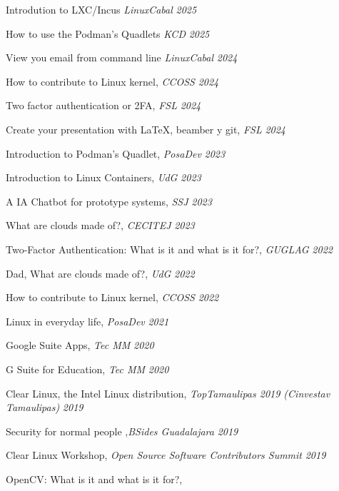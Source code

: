 
\begin{loneinnerlist}

  \item Introdution to LXC/Incus \emph{LinuxCabal} \hfill{\emph{2025}}
  \item How to use the Podman's Quadlets \emph{KCD} \hfill{\emph{2025}}
  \item View you email from command line \emph{LinuxCabal} \hfill{\emph{2024}}
  \item How to contribute to Linux kernel, \emph{CCOSS} \hfill{\emph{2024}}
  \item Two factor authentication or 2FA, \emph{FSL} \hfill{\emph{2024}}
  \item Create your presentation with \LaTeX{}, beamber y git, \emph{FSL} \hfill{\emph{2024}}
  \item Introduction to Podman's Quadlet, \emph{PosaDev} \hfill{\emph{2023}}
  \item Introduction to Linux Containers, \emph{UdG} \hfill{\emph{2023}}
  \item A IA Chatbot for prototype systems, \emph{SSJ} \hfill{\emph{2023}}
  \item What are clouds made of?, \emph{CECITEJ} \hfill{\emph{2023}}
  \item Two-Factor Authentication: What is it and what is it for?,
	\emph{GUGLAG} \hfill{\emph{2022}}
  \item Dad, What are clouds made of?, \emph{UdG} \hfill{\emph{2022}}
  \item How to contribute to Linux kernel, \emph{CCOSS} \hfill{\emph{2022}}
  \item Linux in everyday life, \emph{PosaDev} \hfill{\emph{2021}}
  \item Google Suite Apps, \emph{Tec MM} \hfill{\emph{2020}}
  \item G Suite for Education, \emph{Tec MM} \hfill{\emph{2020}}
  \item Clear Linux, the Intel Linux distribution,
	\emph{TopTamaulipas 2019 (Cinvestav Tamaulipas)} \hfill{\emph{2019}}
  \item  Security for normal people ,\emph{BSides Guadalajara} \hfill{\emph{2019}}
  \item Clear Linux Workshop,
	\emph{Open Source Software Contributors Summit} \hfill{\emph{2019}}
  \item OpenCV: What is it and what is it for?,

\end{loneinnerlist}
